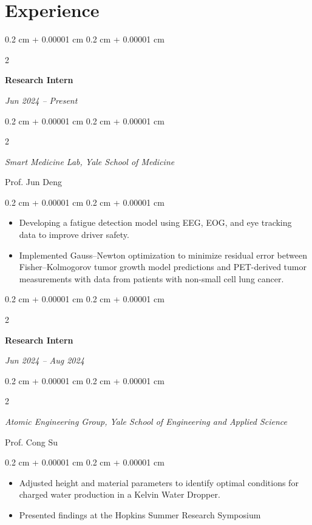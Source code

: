 \documentclass[10pt, letterpaper]{article}
\newenvironment{highlights}{
    \begin{itemize}[
        topsep=0.10 cm,
        parsep=0.10 cm,
        partopsep=0pt,
        itemsep=0pt,
        leftmargin=0.4 cm + 10pt
    ]
}{
    \end{itemize}
} %
\newenvironment{onecolentry}{
    \begin{adjustwidth}{
        0.2 cm + 0.00001 cm
    }{
        0.2 cm + 0.00001 cm
    }
}{
    \end{adjustwidth}
} %
\newenvironment{twocolentry}[2][]{
    \onecolentry
    \def\secondColumn{#2}
    \setcolumnwidth{\fill, 4.5 cm}
    \begin{paracol}{2}
}{
    \switchcolumn \raggedleft \secondColumn
    \end{paracol}
    \endonecolentry
} %
\begin{document}
    \section{Experience}

        \begin{twocolentry}{
            \textit{Jun 2024 – Present}}
            \textbf{Research Intern}
        \end{twocolentry}
        \begin{twocolentry}
            {Prof. Jun Deng}
            {\textit{Smart Medicine Lab, Yale School of Medicine}}
        
        \end{twocolentry}

        \vspace{0.10 cm}
        
        \begin{onecolentry}
            \begin{highlights}
                \item Developing a fatigue detection model using EEG, EOG, and eye tracking data to improve driver safety.
                \item Implemented Gauss–Newton optimization to minimize residual error between Fisher–Kolmogorov tumor growth model predictions and PET-derived tumor measurements with data from patients with non-small cell lung cancer.
            \end{highlights}
        \end{onecolentry}

        \vspace{0.2 cm}


         \begin{twocolentry}{  
            
        \textit{Jun 2024 – Aug 2024}}
            \textbf{Research Intern}
         \end{twocolentry}
        \begin{twocolentry}   
            {Prof. Cong Su}
     
            \textit{Atomic Engineering Group, Yale School of Engineering and Applied Science}
        \end{twocolentry}

        \vspace{0.10 cm}
        
        \begin{onecolentry}
            \begin{highlights}
                \item Adjusted height and material parameters to identify optimal conditions for charged water production in a Kelvin Water Dropper.
                \item Presented findings at the Hopkins Summer Research Symposium
            \end{highlights}
        \end{onecolentry}
\end{document}
